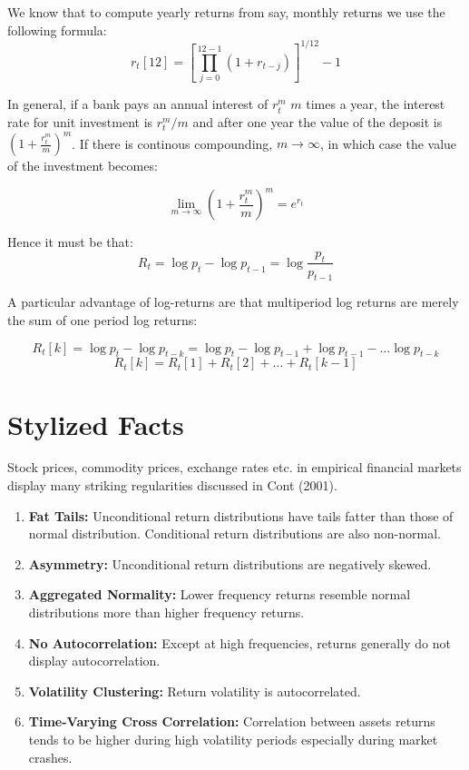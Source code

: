 \documentclass[11pt,]{article}
\providecommand{\tightlist}{%
  \setlength{\itemsep}{0pt}\setlength{\parskip}{0pt}}
\begin{document}
We know that to compute yearly returns from say, monthly returns we use
the following formula:
\[r_{t}[12]= [\prod_{j=0}^{12-1}(1+r_{t-j})]^{1/12}-1\]

In general, if a bank pays an annual interest of \(r^m_t\) \(m\) times a
year, the interest rate for unit investment is \(r^m_t/m\) and after one
year the value of the deposit is \((1+\frac{r_t^m}{m})^m\). If there is
continous compounding, \(m\to \infty\), in which case the value of the
investment becomes:

\[\lim\limits_{m\to \infty}(1+\frac{r_t^m}{m})^m = e^{r_t}\]

Hence it must be that:
\[R_t = \log p_t-\log p_{t-1} = \log\frac{p_t}{p_{t-1}}\]

A particular advantage of log-returns are that multiperiod log returns
are merely the sum of one period log returns:

\[R_t[k]=\log p_t - \log p_{t-k}=\log p_t - \log p_{t-1} + \log p_{t-1} -\hdots \log p_{t-k}\]
\[R_t[k]= R_t[1]+R_t[2]+\hdots+R_t[k-1]\]

\section{Stylized Facts}\label{stylized-facts}

Stock prices, commodity prices, exchange rates etc. in empirical
financial markets display many striking regularities discussed in Cont
(2001).

\begin{enumerate}
\def\labelenumi{\arabic{enumi}.}
\tightlist
\item
  \textbf{Fat Tails:} Unconditional return distributions have tails
  fatter than those of normal distribution. Conditional return
  distributions are also non-normal.
\item
  \textbf{Asymmetry:} Unconditional return distributions are negatively
  skewed.
\item
  \textbf{Aggregated Normality:} Lower frequency returns resemble normal
  distributions more than higher frequency returns.
\item
  \textbf{No Autocorrelation:} Except at high frequencies, returns
  generally do not display autocorrelation.
\item
  \textbf{Volatility Clustering:} Return volatility is autocorrelated.
\item
  \textbf{Time-Varying Cross Correlation:} Correlation between assets
  returns tends to be higher during high volatility periods especially
  during market crashes.
\end{enumerate}
\end{document}
